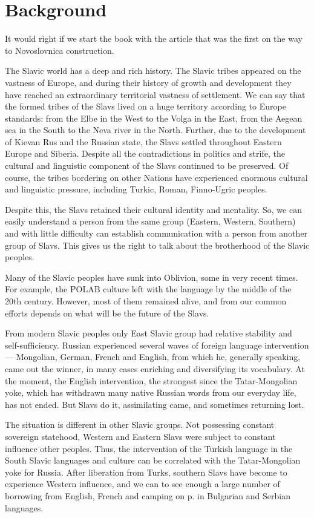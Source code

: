 \chapter{Background}

It would right if we start the book with the article \cite{intro} that was the first on the way to Novoslovnica construction.

The Slavic world has a deep and rich history. The Slavic tribes appeared on the vastness of Europe, and during their history of growth and development they have reached an extraordinary territorial vastness of settlement. We can say that the formed tribes of the Slavs lived on a huge territory according to Europe standards: from the Elbe in the West to the Volga in the East, from the Aegean sea in the South to the Neva river in the North. Further, due to the development of Kievan Rus and the Russian state, the Slavs settled throughout Eastern Europe and Siberia. Despite all the contradictions in politics and strife, the cultural and linguistic component of the Slavs continued to be preserved. Of course, the tribes bordering on other Nations have experienced enormous cultural and linguistic pressure, including Turkic, Roman, Finno-Ugric peoples.

Despite this, the Slavs retained their cultural identity and mentality. So, we can easily understand a person from the same group (Eastern, Western, Southern) and with little difficulty can establish communication with a person from another group of Slavs. This gives us the right to talk about the brotherhood of the Slavic peoples.

Many of the Slavic peoples have sunk into Oblivion, some in very recent times. For example, the POLAB culture left with the language by the middle of the 20th century. However, most of them remained alive, and from our common efforts depends on what will be the future of the Slavs.

From modern Slavic peoples only East Slavic group had relative stability and self-sufficiency. Russian experienced several waves of foreign language intervention — Mongolian, German, French and English, from which he, generally speaking, came out the winner, in many cases enriching and diversifying its vocabulary. At the moment, the English intervention, the strongest since the Tatar-Mongolian yoke, which has withdrawn many native Russian words from our everyday life, has not ended. But Slavs do it, assimilating came, and sometimes returning lost.

The situation is different in other Slavic groups. Not possessing constant sovereign statehood, Western and Eastern Slavs were subject to constant influence other peoples. Thus, the intervention of the Turkish language in the South Slavic languages and culture can be correlated with the Tatar-Mongolian yoke for Russia. After liberation from Turks, southern Slavs have become to experience Western influence, and we can to see enough a large number of borrowing from English, French and camping on p. in Bulgarian and Serbian languages.

